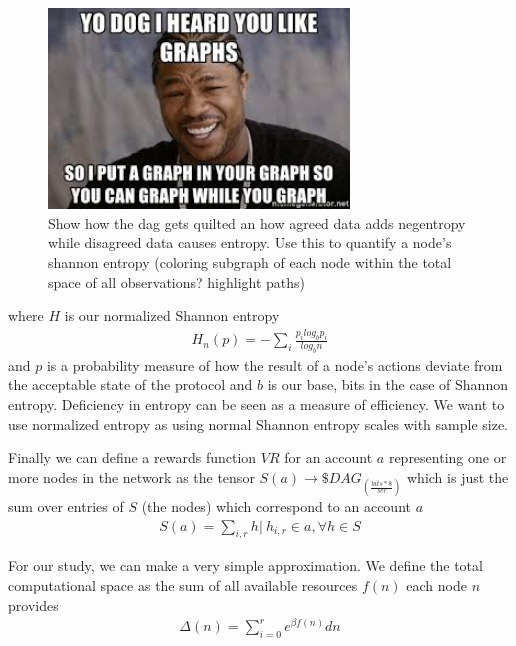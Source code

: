 \documentclass{article}
\begin{document}
\begin{figure}[h]
\caption{Show how the dag gets quilted an how agreed data adds negentropy while disagreed data causes entropy. Use this to quantify a node's shannon entropy (coloring subgraph of each node within the total space of all observations? highlight paths)}
\includegraphics[width=8cm]{yo_dawg}
\centering
\end{figure}

where $H$ is our normalized Shannon entropy
\begin{equation*} \label{eq1}
\begin{split}
H_n(p) = - \sum_i \frac{p_i log_b p_i}{log_b n}
\end{split}
\end{equation*}
and $p$ is a probability measure of how the result of a node's actions deviate from the acceptable state of the protocol and $b$ is our base, bits in the case of Shannon entropy. Deficiency in entropy can be seen as a measure of efficiency. We want to use normalized entropy as using normal Shannon entropy scales with sample size.

Finally we can define a rewards function $VR$ for an account $a$ representing one or more nodes in the network as the tensor $S(a) \rightarrow \$DAG_{(\frac{bits*\$}{sec})}$ which is just the sum over entries of $S$ (the nodes) which correspond to an account $a$
\begin{equation*} \label{eq1}
\begin{split}
S(a) = \sum_{i, r} h | \ h_{i, r} \in a,  \forall h \in S
\end{split}
\end{equation*}

For our study, we can make a very simple approximation. We define the total computational space as the sum of all available resources $f(n)$ each node $n$ provides
\begin{equation*} \label{eq1}
\begin{split}
\Delta(n) = \sum_{i=0}^r e^{\beta f(n)} dn
\end{split}
\end{equation*}
\end{document}

